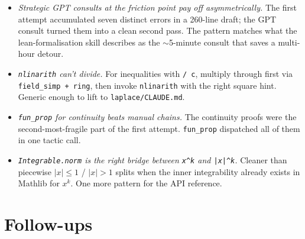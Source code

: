 \documentclass[11pt]{article}
\begin{document}
\begin{itemize}
\item \emph{Strategic GPT consults at the friction point pay off
asymmetrically.} The first attempt accumulated seven distinct errors
in a 260-line draft; the GPT consult turned them into a clean second
pass. The pattern matches what the lean-formalisation skill describes
as the \(\sim\)5-minute consult that saves a multi-hour detour.

\item \emph{\texttt{nlinarith} can't divide.} For inequalities with
\texttt{/ c}, multiply through first via
\texttt{field\_simp + ring}, then invoke \texttt{nlinarith} with the
right square hint. Generic enough to lift to \texttt{laplace/CLAUDE.md}.

\item \emph{\texttt{fun\_prop} for continuity beats manual chains.}
The continuity proofs were the second-most-fragile part of the first
attempt. \texttt{fun\_prop} dispatched all of them in one tactic call.

\item \emph{\texttt{Integrable.norm} is the right bridge between
\texttt{x\^{}k} and \texttt{|x|\^{}k}.} Cleaner than piecewise
\(|x| \le 1\) / \(|x| > 1\) splits when the inner integrability already
exists in Mathlib for \(x^k\). One more pattern for the API reference.
\end{itemize}

\section{Follow-ups}
\end{document}
